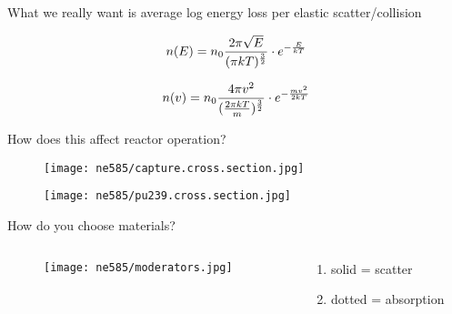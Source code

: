 \documentclass[aspectratio=1610,pdftex,dvipsnames,compress,xcolor={dvipsnames}]{beamer}
\begin{document}
\begin{frame}{What we really want is average log energy loss per elastic scatter/collision}

    \begin{equation}
        \LARGE
        n(E) = n_0 \frac{2\pi\sqrt{E}}{(\pi kT)^{\frac{3}{2}}} \cdot e^{-\frac{E}{kT}}
    \end{equation}

    \vspace*{\fill}

    \begin{equation}
        \LARGE
        n(v) = n_0 \frac{4\pi v^2}{(\frac{2\pi kT}{m})^{\frac{3}{2}}} \cdot e^{-\frac{mv^2}{2kT}}
    \end{equation}

\end{frame}


\begin{frame}{How does this affect reactor operation?}
    \begin{figure}
        \centering
        \texttt{[image: ne585/capture.cross.section.jpg]}
    \end{figure}
\end{frame}


\begin{frame}{}
    \begin{figure}
        \centering
        \texttt{[image: ne585/pu239.cross.section.jpg]}
    \end{figure}
\end{frame}


\begin{frame}{How do you choose materials?}
    \begin{columns}

        \begin{column}{0.75\textwidth}
            \begin{figure}
                \centering
                \texttt{[image: ne585/moderators.jpg]}
            \end{figure}
        \end{column}

        \begin{column}{0.25\textwidth}
            \begin{enumerate}[series=outerlist,topsep=0pt,itemsep=7pt,leftmargin=*,label=(\arabic*)]
                \item[]\small solid = scatter        
                \item[]\small dotted = absorption
            \end{enumerate}
        \end{column}

    \end{columns}
\end{frame}
\end{document}

